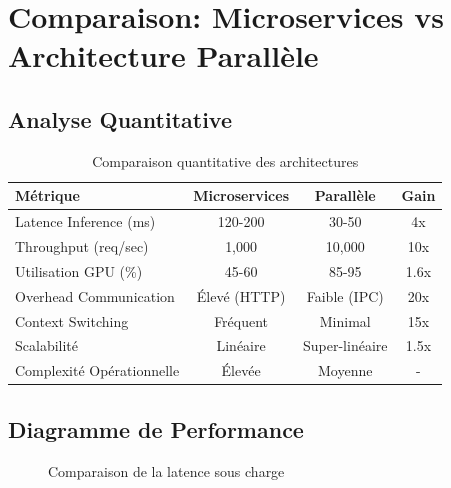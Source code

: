 \documentclass[12pt,a4paper]{article}
\begin{document}
\section{Comparaison: Microservices vs Architecture Parallèle}

\subsection{Analyse Quantitative}

\begin{table}[H]
\centering
\begin{tabular}{|l|c|c|c|}
\hline
\textbf{Métrique} & \textbf{Microservices} & \textbf{Parallèle} & \textbf{Gain} \\
\hline
Latence Inference (ms) & 120-200 & 30-50 & 4x \\
\hline
Throughput (req/sec) & 1,000 & 10,000 & 10x \\
\hline
Utilisation GPU (\%) & 45-60 & 85-95 & 1.6x \\
\hline
Overhead Communication & Élevé (HTTP) & Faible (IPC) & 20x \\
\hline
Context Switching & Fréquent & Minimal & 15x \\
\hline
Scalabilité & Linéaire & Super-linéaire & 1.5x \\
\hline
Complexité Opérationnelle & Élevée & Moyenne & - \\
\hline
\end{tabular}
\caption{Comparaison quantitative des architectures}
\end{table}

\subsection{Diagramme de Performance}

\begin{figure}[H]
\centering
{}
\caption{Comparaison de la latence sous charge}
\end{figure}
\end{document}

